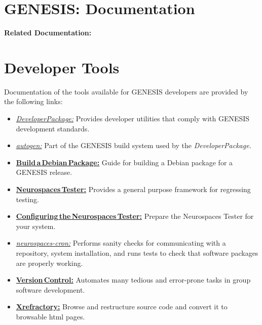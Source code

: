 \documentclass[12pt]{article}
\begin{document}
\section*{GENESIS: Documentation}

{\bf Related Documentation:}

\section*{Developer Tools}

Documentation of the tools available for GENESIS developers are provided by the following links:

\begin{itemize}
   \item[]\href{../developer=package/developer-package.tex}{\it DeveloperPackage:} Provides developer utilities that comply with GENESIS development standards.
   \item[]\href{../autogen/autogen.tex}{\it autogen:} Part of the GENESIS build system used by the {\it DeveloperPackage}.
   \item[]\href{../build-debian/build-debian.tex}{\bf Build\,a\,Debian\,Package:} Guide for building a Debian package for a GENESIS release.
   \item[]\href{../neurospaces-tester/neurospaces-tester.tex}{\bf Neurospaces\,Tester:} Provides a general purpose framework for regressing testing. 
   \item[]\href{../tester-configuration/tester-configuration.tex}{\bf Configuring\,the\,Neurospaces\,Tester:} Prepare the Neurospaces Tester for your system.
   \item[]\href{../neurospaces-cron/neurospaces-cron.tex}{\it neurospaces-cron:} Performs sanity checks for communicating with a repository, system installation, and runs tests to check that software packages are properly working.
   \item[]\href{../version-control/version-control.tex}{\bf Version\,Control:} Automates many tedious and error-prone tasks in group software development.
   \item[]\href{../cxref/cxref.tex}{\bf Xrefractory:} Browse and restructure source code and convert it to browsable html pages. 

\end{itemize}
\end{document}
